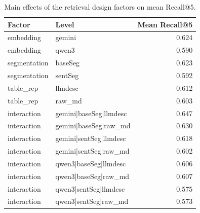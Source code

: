 \begin{table}[htbp]
  \centering
  \caption{Main effects of the retrieval design factors on mean Recall@5.}
  \label{tab:retrieval-main-effects}
  \begin{tabular}{llr}
    \toprule
    Factor & Level & Mean Recall@5 \\
    \midrule
    embedding & gemini & 0.624 \\
    embedding & qwen3 & 0.590 \\
    segmentation & baseSeg & 0.623 \\
    segmentation & sentSeg & 0.592 \\
    table\_rep & llmdesc & 0.612 \\
    table\_rep & raw\_md & 0.603 \\
    interaction & gemini|baseSeg|llmdesc & 0.647 \\
    interaction & gemini|baseSeg|raw\_md & 0.630 \\
    interaction & gemini|sentSeg|llmdesc & 0.618 \\
    interaction & gemini|sentSeg|raw\_md & 0.602 \\
    interaction & qwen3|baseSeg|llmdesc & 0.606 \\
    interaction & qwen3|baseSeg|raw\_md & 0.607 \\
    interaction & qwen3|sentSeg|llmdesc & 0.575 \\
    interaction & qwen3|sentSeg|raw\_md & 0.573 \\
    \bottomrule
  \end{tabular}
\end{table}
